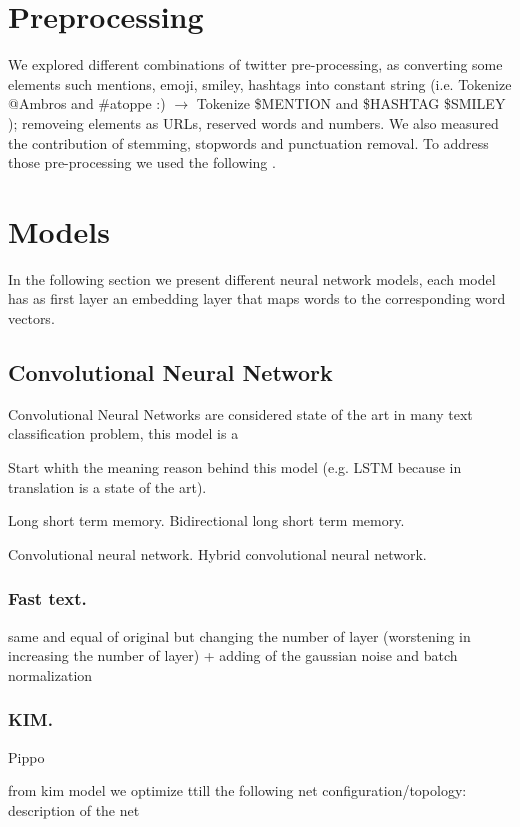 \section{Preprocessing}
We explored different combinations of twitter pre-processing, as converting some elements such mentions, emoji, smiley, hashtags into constant string (i.e. Tokenize @Ambros and \#atoppe :) $\rightarrow $ Tokenize \$MENTION and \$HASHTAG \$SMILEY ); removeing elements as URLs, reserved words and numbers.
We also measured the contribution of stemming, stopwords and punctuation removal.
To address those pre-processing we used the following \cite{nltk} \cite{tweets-preprocessor}.


\section{Models}

In the following section we present different neural network models, each model has as first layer an embedding layer that maps words to the corresponding word vectors.


\subsection{Convolutional Neural Network}
Convolutional Neural Networks are considered state of the art in many text classification problem, this model is a

Start whith the meaning reason behind this model (e.g. LSTM because in translation is a state of the art).

Long short term memory.
Bidirectional long short term memory.

Convolutional neural network.
Hybrid convolutional neural network.

\subsubsection{Fast text.}

same and equal of original but changing the number of layer  (worstening in increasing the number of layer) + adding of the gaussian noise and batch normalization

\subsubsection{KIM.}

Pippo \cite{kim2014convolutional}



from kim model we optimize ttill the following net configuration/topology: description of the net